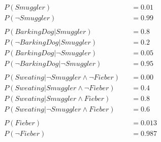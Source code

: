 \documentclass[ngerman]{fbi-aufgabenblatt}
\begin{document}


\begin{align*}
&P(Smuggler) &&= 0.01\\
&P(\neg Smuggler) &&= 0.99\\
&\\
&P(BarkingDog | Smuggler) &&= 0.8\\
&P(\neg BarkingDog | Smuggler) &&= 0.2\\
&P(BarkingDog | \neg Smuggler) &&= 0.05\\
&P(\neg BarkingDog | \neg Smuggler) &&= 0.95\\
&\\
&P(Sweating | \neg Smuggler \land  \neg Fieber) &&= 0.00\\
&P(Sweating |  Smuggler \land \neg Fieber) &&= 0.4\\
&P(Sweating |  Smuggler \land Fieber) &&= 0.8\\
&P(Sweating |  \neg Smuggler \land Fieber) &&= 0.6\\
&\\
&P(Fieber) &&= 0.013\\
&P(\neg Fieber) &&= 0.987\\
\end{align*}
\end{document}

